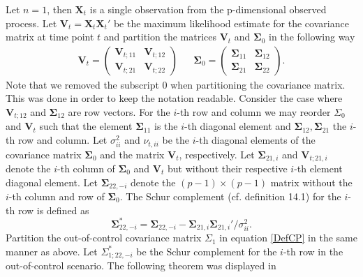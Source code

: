  Let $n=1$, then $\mathbf{X}_t$ is a single observation from the p-dimensional observed process. Let $\mathbf{V}_t=\mathbf{X}_t\mathbf{X}_t'$ be the maximum likelihood estimate for the covariance matrix at time point $t$ and partition the matrices $\mathbf{V}_t$ and $\boldsymbol{\Sigma}_0$ in the following way
\begin{align}
\mathbf{V}_t=\begin{pmatrix}
\mathbf{V}_{t;11} & \mathbf{V}_{t;12} \\
\mathbf{V}_{t;21} & \mathbf{V}_{t;22}
\end{pmatrix} & & \boldsymbol{\Sigma}_0=\begin{pmatrix}
\boldsymbol{\Sigma}_{11} & \boldsymbol{\Sigma}_{12} \\
\boldsymbol{\Sigma}_{21} & \boldsymbol{\Sigma}_{22}
\end{pmatrix}.
\end{align}
Note that we removed the subscript 0 when partitioning the covariance matrix. This was done in order to keep the notation readable. Consider the case where $\mathbf{V}_{t;12}$ and $\boldsymbol{\Sigma}_{12}$ are row vectors. For the $i$-th row and column we may reorder $\Sigma_0$ and $\mathbf{V}_t$ such that the element $\boldsymbol{\Sigma}_{11}$ is the $i$-th diagonal element and $\boldsymbol{\Sigma}_{12},\boldsymbol{\Sigma}_{21}$ the $i$-th row and column. Let $\sigma^2_{ii}$ and $\nu_{t,ii}$ be the $i$-th diagonal elements of the covariance matrix $\boldsymbol{\Sigma}_0$ and the matrix $\mathbf{V}_t$, respectively. Let $\boldsymbol{\Sigma}_{21,i}$ and $\mathbf{V}_{t;21,i}$ denote the $i$-th column of $\boldsymbol{\Sigma}_0$ and $\mathbf{V}_{t}$ but without their respective $i$-th element diagonal element. Let $\boldsymbol{\Sigma}_{22,-i}$ denote the $(p-1) \times (p-1)$ matrix without the $i$-th column and row of $\boldsymbol{\Sigma}_0$. The Schur complement (cf. \citet{MatrixHandbook} definition 14.1) for the $i$-th row is defined as
$$
\boldsymbol{\Sigma}^*_{22,-i} = \boldsymbol{\Sigma}_{22,-i} - \boldsymbol{\Sigma}_{21,i}\boldsymbol{\Sigma}_{21,i}'/\sigma^2_{ii}.
$$   
Partition the out-of-control covariance matrix $\Sigma_1$ in equation \eqref{DefCP} in the same manner as above. Let $\Sigma^*_{1;22,-i}$ be the Schur complement for the $i$-th row in the out-of-control scenario. The following theorem was displayed in \citet{Bodnar2009} 
